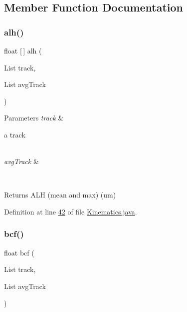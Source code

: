 \subsection{Member Function Documentation}
\hypertarget{classfunctions_1_1_kinematics_a8f8221f314e814927fb192ea65f2af4a}{}\label{classfunctions_1_1_kinematics_a8f8221f314e814927fb192ea65f2af4a} 
\subsubsection{\texorpdfstring{alh()}{alh()}}
{\footnotesize\ttfamily float \mbox{[}$\,$\mbox{]} alh (\begin{DoxyParamCaption}\item[{List}]{track,  }\item[{List}]{avg\+Track }\end{DoxyParamCaption})}


\begin{DoxyParams}{Parameters}
{\em track} & 
\begin{DoxyItemize}
\item a track 
\end{DoxyItemize}\\
\hline
{\em avg\+Track} & 
\begin{DoxyItemize}
\item 
\end{DoxyItemize}\\
\hline
\end{DoxyParams}
\begin{DoxyReturn}{Returns}
A\+LH (mean and max) (um) 
\end{DoxyReturn}


Definition at line \hyperlink{_kinematics_8java_source_l00042}{42} of file \hyperlink{_kinematics_8java_source}{Kinematics.\+java}.

\hypertarget{classfunctions_1_1_kinematics_ac35b9a912f923321eee5335c011f7c89}{}\label{classfunctions_1_1_kinematics_ac35b9a912f923321eee5335c011f7c89} 
\subsubsection{\texorpdfstring{bcf()}{bcf()}}
{\footnotesize\ttfamily float bcf (\begin{DoxyParamCaption}\item[{List}]{track,  }\item[{List}]{avg\+Track }\end{DoxyParamCaption})}


